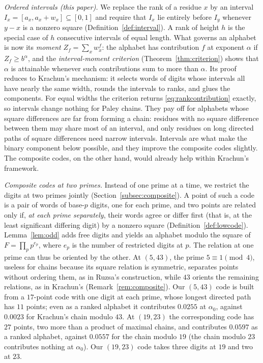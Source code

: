 \documentclass[11pt]{article}
\theoremstyle{definition}
\theoremstyle{remark}
\newcommand{\al}{\alpha_0}
\begin{document}
\emph{Ordered intervals (this paper).} We replace the rank of a residue $x$ by
an interval $I_x=[a_x,a_x+w_x]\subseteq[0,1]$ and require that $I_x$ lie
entirely before $I_y$ whenever $y-x$ is a nonzero square
(Definition~\ref{def:interval}). A rank of height $h$ is the special case of
$h$ consecutive intervals of equal length. What governs an alphabet is now its
\emph{moment} $Z_f=\sum_xw_x^f$: the alphabet has contribution $f$ at exponent
$\alpha$ if $Z_f\ge b^\alpha$, and the \emph{interval-moment criterion}
(Theorem~\ref{thm:criterion}) shows that $\alpha$ is attainable whenever such
contributions sum to more than $\alpha$. Its proof reduces to Krachun's
mechanism: it selects words of digits whose intervals all have nearly the same
width, rounds the intervals to ranks, and glues the components. For equal
widths the criterion returns \eqref{eq:rankcontribution} exactly, so intervals
change nothing for Paley chains. They pay off for alphabets whose square
differences are far from forming a chain: residues with no square difference
between them may share most of an interval, and only residues on long directed
paths of square differences need narrow intervals. Intervals are what make the
binary component below possible, and they improve the composite codes
slightly. The composite codes, on the other hand, would already help within
Krachun's framework.

\emph{Composite codes at two primes.} Instead of one prime at a time, we
restrict the digits at two primes jointly (Section~\ref{subsec:composite}). A
point of such a code is a pair of words of base-$p$ digits, one for each
prime, and two points are related only if, \emph{at each prime separately},
their words agree or differ first (that is, at the least significant
differing digit) by a nonzero square (Definition~\ref{def:lowcode}). Lemma~\ref{lem:odd} adds free digits and
yields an alphabet modulo the square of $F=\prod_pp^{e_p}$, where $e_p$ is the
number of restricted digits at $p$. The relation at one prime can thus be
oriented by the other. At $(5,43)$, the prime $5\equiv1\pmod4$, useless for
chains because its square relation is symmetric, separates points without
ordering them, as in Ruzsa's construction, while $43$ orients the remaining
relations, as in Krachun's (Remark~\ref{rem:composite}). Our $(5,43)$ code is
built from a $17$-point code with one digit at each prime, whose longest
directed path has $11$ points; even as a ranked alphabet it contributes
$0.0255$ at $\al$, against $0.0023$ for Krachun's chain modulo $43$. At
$(19,23)$ the corresponding code has $27$ points, two more than a product of
maximal chains, and contributes $0.0597$ as a ranked alphabet, against
$0.0557$ for the chain modulo $19$ (the chain modulo $23$ contributes nothing
at $\al$). Our $(19,23)$ code takes three digits at $19$ and two at $23$.
\end{document}
